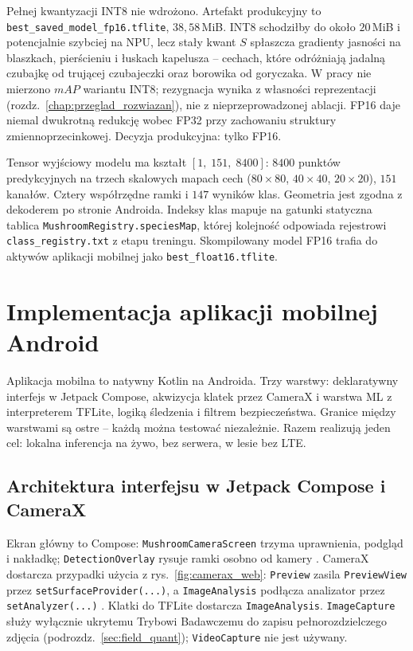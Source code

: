Pełnej kwantyzacji INT8 nie wdrożono. Artefakt produkcyjny to \texttt{best\_saved\_model\_fp16.tflite}, $38{,}58$\,MiB. INT8 schodziłby do około $20$\,MiB i potencjalnie szybciej na NPU, lecz stały kwant $S$ spłaszcza gradienty jasności na blaszkach, pierścieniu i łuskach kapelusza -- cechach, które odróżniają jadalną czubajkę od trującej czubajeczki oraz borowika od goryczaka. W pracy nie mierzono $mAP$ wariantu INT8; rezygnacja wynika z własności reprezentacji (rozdz.~\ref{chap:przeglad_rozwiazan}), nie z nieprzeprowadzonej ablacji. FP16 daje niemal dwukrotną redukcję wobec FP32 przy zachowaniu struktury zmiennoprzecinkowej. Decyzja produkcyjna: tylko FP16.

Tensor wyjściowy modelu ma kształt $[1,\;151,\;8400]$: $8400$ punktów predykcyjnych na trzech skalowych mapach cech ($80{\times}80$, $40{\times}40$, $20{\times}20$), $151$ kanałów. Cztery współrzędne ramki i $147$ wyników klas. Geometria jest zgodna z dekoderem po stronie Androida. Indeksy klas mapuje na gatunki statyczna tablica \texttt{MushroomRegistry.speciesMap}, której kolejność odpowiada rejestrowi \texttt{class\_registry.txt} z etapu treningu. Skompilowany model FP16 trafia do aktywów aplikacji mobilnej jako \texttt{best\_float16.tflite}.

\section{Implementacja aplikacji mobilnej Android}
Aplikacja mobilna to natywny Kotlin na Androida. Trzy warstwy: deklaratywny interfejs w Jetpack Compose, akwizycja klatek przez CameraX i warstwa ML z interpreterem TFLite, logiką śledzenia i filtrem bezpieczeństwa. Granice między warstwami są ostre – każdą można testować niezależnie. Razem realizują jeden cel: lokalna inferencja na żywo, bez serwera, w lesie bez LTE.

\subsection{Architektura interfejsu w Jetpack Compose i CameraX}
Ekran główny to Compose: \texttt{MushroomCameraScreen} trzyma uprawnienia, podgląd i nakładkę; \texttt{DetectionOverlay} rysuje ramki osobno od kamery \cite{jetpackcompose}. CameraX dostarcza przypadki użycia z rys.~\ref{fig:camerax_web}: \texttt{Preview} zasila \texttt{PreviewView} przez \texttt{setSurfaceProvider(...)}, a \texttt{ImageAnalysis} podłącza analizator przez \texttt{setAnalyzer(...)} \cite{camerax}. Klatki do TFLite dostarcza \texttt{ImageAnalysis}. \texttt{ImageCapture} służy wyłącznie ukrytemu Trybowi Badawczemu do zapisu pełnorozdzielczego zdjęcia (podrozdz.~\ref{sec:field_quant}); \texttt{VideoCapture} nie jest używany.

